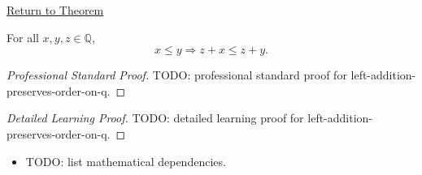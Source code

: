 \newpage
{}
\label{prf:left-addition-preserves-order-on-q}

\begin{remark*}[Return]
\hyperref[thm:left-addition-preserves-order-on-q]{Return to Theorem}
\end{remark*}

\begin{theorem*}
For all $x,y,z\in\mathbb{Q}$,
\[
x\le y \Longrightarrow z+x\le z+y.
\]
\end{theorem*}

\begin{proof}[Professional Standard Proof]
\LRAProofBodyStart
TODO: professional standard proof for left-addition-preserves-order-on-q.
\end{proof}

\begin{proof}[Detailed Learning Proof]
\LRAProofBodyStart
TODO: detailed learning proof for left-addition-preserves-order-on-q.
\end{proof}

\begin{remark*}
\end{remark*}

\begin{dependencies}
\begin{itemize}
  \item TODO: list mathematical dependencies.
\end{itemize}
\end{dependencies}

\clearpage
